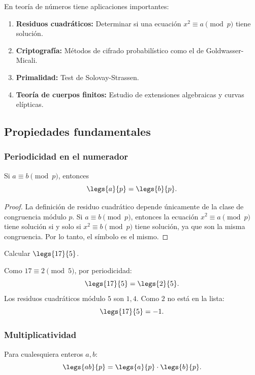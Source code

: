 En teoría de números tiene aplicaciones importantes:
\begin{enumerate}
    \item \textbf{Residuos cuadráticos:} Determinar si una ecuación $x^2 \equiv a \pmod{p}$ tiene solución.
    \item \textbf{Criptografía:} Métodos de cifrado probabilístico como el de Goldwasser-Micali.
    \item \textbf{Primalidad:} Test de Solovay-Strassen.
    \item \textbf{Teoría de cuerpos finitos:} Estudio de extensiones algebraicas y curvas elípticas.
\end{enumerate}
\subsection{Propiedades fundamentales}
\subsubsection{Periodicidad en el numerador}

\begin{teorema}
Si $a \equiv b \pmod{p}$, entonces
\[
\legs{a}{p} = \legs{b}{p}.
\]
\end{teorema}
\begin{proof}
La definición de residuo cuadrático depende únicamente de la clase de congruencia módulo $p$. Si $a \equiv b \pmod{p}$, entonces la ecuación $x^2 \equiv a \pmod{p}$ tiene solución si y solo si $x^2 \equiv b \pmod{p}$ tiene solución, ya que son la misma congruencia. Por lo tanto, el símbolo es el mismo.
\end{proof}

\begin{ejemplo}
Calcular $\legs{17}{5}$.
\end{ejemplo}
\begin{solucion}
Como $17 \equiv 2 \pmod{5}$, por periodicidad:
\[
\legs{17}{5} = \legs{2}{5}.
\]
Los residuos cuadráticos módulo $5$ son $1, 4$. Como $2$ no está en la lista:
\[
\legs{17}{5} = -1.
\]
\end{solucion}

\subsubsection{Multiplicatividad}

\begin{teorema}
Para cualesquiera enteros $a, b$:
\[
\legs{ab}{p} = \legs{a}{p} \cdot \legs{b}{p}.
\]
\end{teorema}

